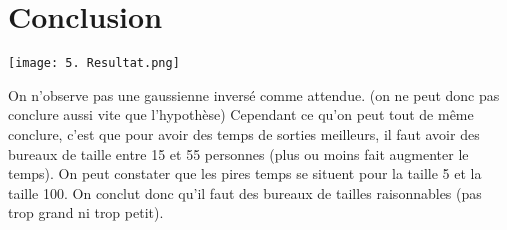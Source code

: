 \documentclass[12pt]{article}
\begin{document}
\section{Conclusion}
\texttt{[image: 5. Resultat.png]}
\newline\newline

On n'observe pas une gaussienne inversé comme attendue. (on ne peut donc pas conclure aussi vite que l'hypothèse)
\newline\newline
Cependant ce qu'on peut tout de même conclure, c'est que pour avoir des temps de sorties meilleurs, il faut avoir des bureaux de taille entre 15 et 55 personnes
(plus ou moins fait augmenter le temps).
\newline
On peut constater que les pires temps se situent pour la taille 5 et la taille 100.
\newline\newline
On conclut donc qu'il faut des bureaux de tailles raisonnables (pas trop grand ni trop petit).
\end{document}
